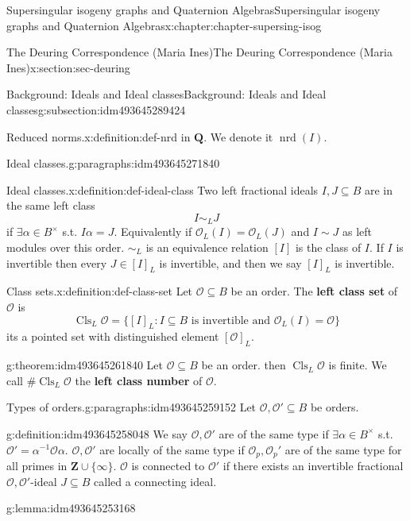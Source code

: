 \documentclass[oneside,10pt,]{book}
\newcommand{\terminology}[1]{\textbf{#1}}
\numberwithin{equation}{section}
\newcommand{\inv}{^{-1}}
\newcommand{\lb}{[}
\newcommand{\rb}{]}
\newcommand{\ZZ}{\mathbf{Z}}
\newcommand{\QQ}{\mathbf{Q}}
\newcommand{\ints}{\mathcal{O}}
\begin{document}
\begin{chapterptx}{Supersingular isogeny graphs and Quaternion Algebras}{}{Supersingular isogeny graphs and Quaternion Algebras}{}{}{x:chapter:chapter-supersing-isog}
\begin{sectionptx}{The Deuring Correspondence (Maria Ines)}{}{The Deuring Correspondence (Maria Ines)}{}{}{x:section:sec-deuring}
\begin{subsectionptx}{Background: Ideals and Ideal classes}{}{Background: Ideals and Ideal classes}{}{}{g:subsection:idm493645289424}
\begin{definition}{Reduced norms.}{x:definition:def-nrd}
in \(\QQ\). We denote it \(\operatorname{nrd}(I)\).%
\end{definition}
\begin{paragraphs}{Ideal classes.}{g:paragraphs:idm493645271840}%
\begin{definition}{Ideal classes.}{x:definition:def-ideal-class}%
Two left fractional ideals \(I,J \subseteq B\) are in the same left class%
\begin{equation*}
I\sim_L J
\end{equation*}
if \(\exists  \alpha \in B^\times\) s.t. \(I\alpha = J\). Equivalently if \(\ints_L(I)  = \ints_L(J)\) and \(I \sim J\) as left modules over this order. \(\sim_L\) is an equivalence relation \(\lb I \rb\) is the class of \(I\). If \(I \) is invertible then every \(J \in \lb I \rb_L\) is invertible, and then we say \(\lb I \rb_L \) is invertible.%
\end{definition}
\begin{definition}{Class sets.}{x:definition:def-class-set}%
Let \(\ints \subseteq B\) be an order. The \terminology{left class set} of \(\ints\) is%
\begin{equation*}
\operatorname{Cls}_L \ints   = \{ \lb I \rb_L : I \subseteq B \text{ is invertible  and } \ints_L(I) = \ints\}
\end{equation*}
its a pointed set with distinguished element \(\lb \ints \rb_L\).%
\end{definition}
\begin{theorem}{}{}{g:theorem:idm493645261840}%
Let \(\ints \subseteq B\) be an order. then \(\operatorname{Cls} _L \ints\) is finite. We call \(\# \operatorname{Cls}_L\ints \) the \terminology{left class number} of \(\ints\).%
\end{theorem}
\end{paragraphs}%
\begin{paragraphs}{Types of orders.}{g:paragraphs:idm493645259152}%
Let \(\ints ,\ints'  \subseteq B\) be orders.%
\begin{definition}{}{g:definition:idm493645258048}%
We say \(\ints,\ints' \) are of the same type if \(\exists \alpha \in B^\times\) s.t. \(\ints ' = \alpha \inv \ints \alpha\). \(\ints,\ints'\) are locally of the same type if \(\ints_p, \ints_p'\) are of the same type for all primes in \(\ZZ\cup\{\infty\}\). \(\ints\) is connected to  \(\ints'\) if there exists an invertible fractional \(\ints,\ints'\)-ideal \(J \subseteq B\) called a connecting ideal.%
\end{definition}
\begin{lemma}{}{}{g:lemma:idm493645253168}%

\end{lemma}
\end{paragraphs}
\end{subsectionptx}
\end{sectionptx}
\end{chapterptx}
\end{document}
